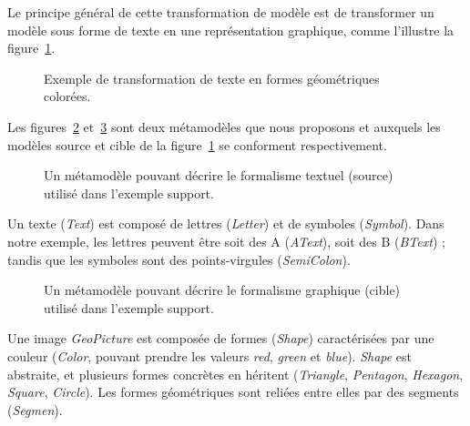 Le principe général de cette transformation de modèle est de transformer un
modèle sous forme de texte en une représentation graphique, comme l'illustre la
figure~\ref{fig:rappelSimpleTransfo}.

\begin{figure}[h]
  \begin{center}
   
   \caption{Exemple de transformation de texte en formes géométriques colorées.}
    \label{fig:rappelSimpleTransfo}
  \end{center}
\end{figure}

Les figures~\ref{fig:textmmodel} et~\ref{fig:picturemmodel} sont deux
métamodèles que nous proposons et auxquels les modèles source et cible de la
figure~\ref{fig:rappelSimpleTransfo} se conforment respectivement.

\begin{figure}[h]
  \begin{center}
    
    \caption{Un métamodèle pouvant décrire le formalisme textuel (source)
    utilisé dans l'exemple support.}
    \label{fig:textmmodel}
  \end{center}
\end{figure}

Un texte (\emph{Text}) est composé de lettres (\emph{Letter}) et de symboles
(\emph{Symbol}). Dans notre exemple, les lettres peuvent être soit des A
(\emph{AText}), soit des B (\emph{BText}) ; tandis que les symboles sont des
points-virgules (\emph{SemiColon}).

\begin{figure}[h]
  \begin{center}
    
    \caption{Un métamodèle pouvant décrire le formalisme graphique (cible)
    utilisé dans l'exemple support.}
    \label{fig:picturemmodel}
  \end{center}
\end{figure}

Une image \emph{GeoPicture} est composée de formes (\emph{Shape}) caractérisées
par une couleur (\emph{Color}, pouvant prendre les valeurs \emph{red},
\emph{green} et \emph{blue}). \emph{Shape} est abstraite, et plusieurs formes
concrètes en héritent (\emph{Triangle}, \emph{Pentagon}, \emph{Hexagon},
\emph{Square}, \emph{Circle}). Les formes géométriques sont reliées entre elles
par des segments (\emph{Segmen}).


\FloatBarrier

